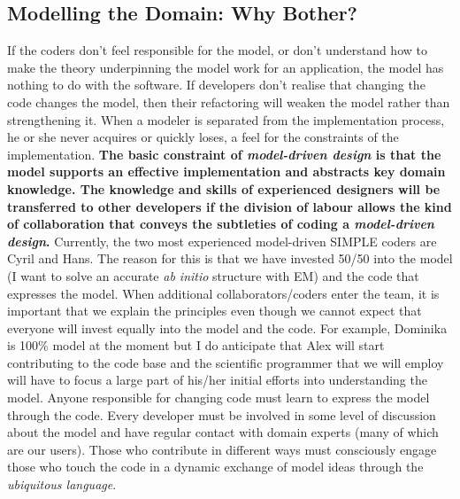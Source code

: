 \documentclass[a4paper,11pt]{article}
\begin{document}
\subsection{Modelling the Domain: Why Bother?}
If the coders don't feel responsible for the model, or don't understand how to make the theory underpinning the model work for an application, the model has nothing to do with the software. If developers don't realise that changing the code changes the model, then their refactoring will weaken the model rather than strengthening it. When a modeler is separated from the implementation process, he or she never acquires or quickly loses, a feel for the constraints of the implementation. \textbf{The basic constraint of \textit{model-driven design} is that the model supports an effective implementation and abstracts key domain knowledge. The knowledge and skills of experienced designers will  be transferred to other developers if the division of labour allows the kind of collaboration that conveys the subtleties of coding a \textit{model-driven design}.} Currently, the two most experienced model-driven SIMPLE coders are Cyril and Hans. The reason for this is that we have invested 50/50 into the model (I want to solve an accurate \textit{ab initio} structure with EM) and the code that expresses the model. When additional collaborators/coders enter the team, it is important that we explain the principles even though we cannot expect that everyone will invest equally into the model and the code. For example, Dominika is 100\% model at the moment but I do anticipate that Alex will start contributing to the code base and the scientific programmer that we will employ will have to focus a large part of his/her initial efforts into understanding the model. Anyone responsible for changing code must learn to express the model through the code. Every developer must be involved in some level of discussion about the model and have regular contact with domain experts (many of which are our users). Those who contribute in different ways must consciously engage those who touch the code in a dynamic exchange of model ideas through the \textit{ubiquitous language}.
\end{document}
